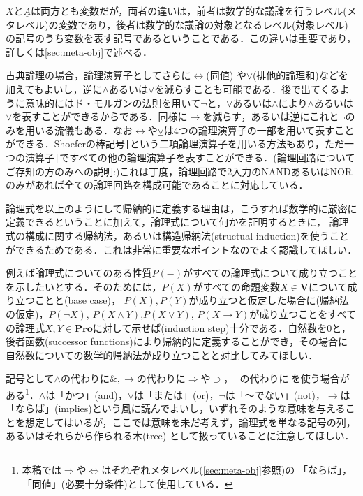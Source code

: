 \documentclass{ltjsarticle}
\theoremstyle{mystyle1}
\theoremstyle{mystyle2}
\newcommand{\uA}{\underline{A}}
\newcommand{\bV}{\ensuremath{\mathbf{V}}}
\newcommand{\bPro}{\ensuremath{\mathbf{Pro}}}
\newcommand{\red}[1]{{\color{red} #1}}
\begin{document}
$X$と$\uA$は両方とも変数だが，両者の違いは，前者は数学的な議論を行うレベル(メタレベル)の変数であり，後者は数学的な議論の対象となるレベル(対象レベル)の記号のうち変数を表す記号であるということである．この違いは重要であり，詳しくは\ref{sec:meta-obj}で述べる．

古典論理の場合，論理演算子としてさらに$\leftrightarrow$(同値) や$\veebar$(排他的論理和)などを加えてもよいし，逆に$\wedge$あるいは$\vee$を減らすことも可能である．後で出てくるように意味的にはド・モルガンの法則を用いて$\neg$と，$\vee$あるいは$\wedge$により$\wedge$あるいは$\vee$を表すことができるからである．同様に$\to$を減らす，あるいは逆にこれと$\neg$のみを用いる流儀もある．なお$\leftrightarrow$や$\veebar$は4つの論理演算子の一部を用いて表すことができる．Shoeferの棒記号\verb!|!という二項論理演算子を用いる方法もあり，ただ一つの演算子\verb!|!ですべての他の論理演算子を表すことができる．(論理回路についてご存知の方のみへの説明:)これは丁度，論理回路で2入力のNANDあるいはNORのみがあれば全ての論理回路を構成可能であることに対応している．

論理式を以上のようにして帰納的に定義する理由は，こうすれば数学的に厳密に定義できるということに加えて，論理式について何かを証明するときに，\red{論理式の構成に関する帰納法，あるいは構造帰納法}(structual induction)を使うことができるためである．これは非常に重要なポイントなのでよく認識してほしい．

例えば論理式についてのある性質$P\left(-\right)$がすべての論理式について成り立つことを示したいとする．そのためには，$P\left(X\right)$がすべての命題変数$X\in\bV$について成り立つことと(base case)， $P(X),P(Y)$が成り立つと仮定した場合に(帰納法の仮定)，$P(\neg X)$, $P(X\wedge Y)$,$P(X\vee Y)$, $P(X \to Y)$が成り立つことをすべての論理式$X,Y\in \bPro$に対して示せば(induction step)十分である．自然数を0と，\red{後者函数}(successor functions)により帰納的に定義することができ，その場合に自然数についての数学的帰納法が成り立つことと対比してみてほしい．

記号として$\wedge$の代わりに$\&,\to$の代わりに$\Rightarrow$や$\supset$，$\neg$の代わりに$~$を使う場合がある\footnote{本稿では$\Rightarrow$や$\Leftrightarrow$はそれぞれメタレベル(\ref{sec:meta-obj}参照)の 「ならば」，「同値」(必要十分条件)として使用している．}．$\wedge$は「かつ」(and)，$\vee$は「または」(or)，$\neg$は「～でない」(not)，$\to$は「ならば」(implies)という風に読んでよいし，いずれそのような意味を与えることを想定してはいるが，ここでは意味を未だ考えず，論理式を単なる記号の列，あるいはそれらから作られる木(tree) として扱っていることに注意してほしい．
\end{document}

